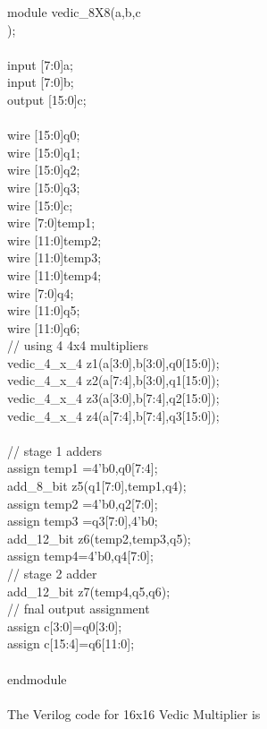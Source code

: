 module vedic\_8X8(a,b,c\\
    );\\
   \\
input [7:0]a;\\
input [7:0]b;\\
output [15:0]c;\\
\\
wire [15:0]q0;	\\
wire [15:0]q1;	\\
wire [15:0]q2;\\
wire [15:0]q3;	\\
wire [15:0]c;\\
wire [7:0]temp1;\\
wire [11:0]temp2;\\
wire [11:0]temp3;\\
wire [11:0]temp4;\\
wire [7:0]q4;\\
wire [11:0]q5;\\
wire [11:0]q6;\\
// using 4 4x4 multipliers\\
vedic\_4\_x\_4 z1(a[3:0],b[3:0],q0[15:0]);\\
vedic\_4\_x\_4 z2(a[7:4],b[3:0],q1[15:0]);\\
vedic\_4\_x\_4 z3(a[3:0],b[7:4],q2[15:0]);\\
vedic\_4\_x\_4 z4(a[7:4],b[7:4],q3[15:0]);\\
\\
// stage 1 adders \\
assign temp1 ={4'b0,q0[7:4]};\\
add\_8\_bit z5(q1[7:0],temp1,q4);\\
assign temp2 ={4'b0,q2[7:0]};\\
assign temp3 ={q3[7:0],4'b0};\\
add\_12\_bit z6(temp2,temp3,q5);\\
assign temp4={4'b0,q4[7:0]};\\
// stage 2 adder\\
add\_12\_bit z7(temp4,q5,q6);\\
// fnal output assignment \\
assign c[3:0]=q0[3:0];\\
assign c[15:4]=q6[11:0];\\
\\
endmodule\\
\\
The Verilog code for 16x16 Vedic Multiplier is\\
\\
